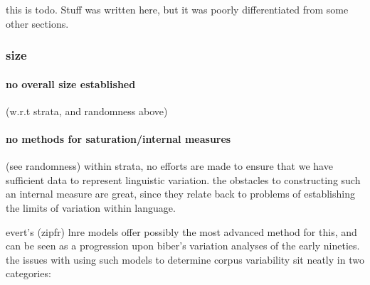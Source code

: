 this is todo.  Stuff was written here, but it was poorly differentiated from some other sections.









\subsubsection{size}

\paragraph{ no overall size established }
(w.r.t strata, and randomness above)

\paragraph{ no methods for saturation/internal measures}
(see randomness)
within strata, no efforts are made to ensure that we have sufficient data to represent linguistic variation.  the obstacles to constructing such an internal measure are great, since they relate back to problems of establishing the limits of variation within language.

evert's (zipfr) lnre models offer possibly the most advanced method for this, and can be seen as a progression upon biber's variation analyses of the early nineties.  the issues with using such models to determine corpus variability sit neatly in two categories:

